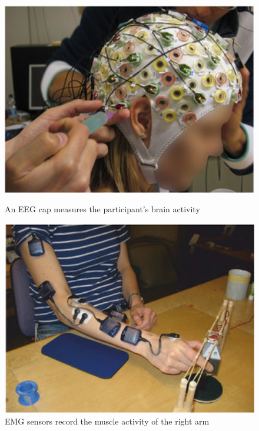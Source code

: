 \documentclass{article} %
\begin{document}
\begin{figure}
	\centering
	\begin{minipage}{0.5\textwidth}
		\centering
		\includegraphics[width=1.0\textwidth]{images/eeg_setup.jpg}
		\caption{An EEG cap measures the participant's brain activity \cite{nature}}
		\label{fig:eeg_setup}
	\end{minipage}\hfill
	\begin{minipage}{0.49\textwidth}
		\centering
		\includegraphics[width=1.0\textwidth]{images/emg_setup.jpg}
		\caption{EMG sensors record the muscle activity of the right arm \cite{nature}}
		\label{fig:emg_setup}
	\end{minipage}
\end{figure}
\end{document}
